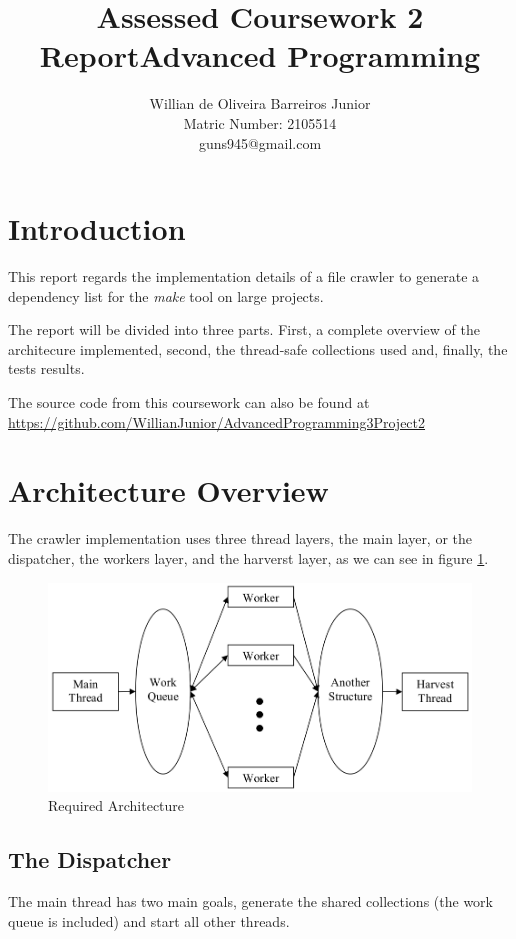 \documentclass[twocolumn,20pt]{article}
\title{Assessed Coursework 2 Report\linebreak Advanced Programming }
\author{Willian de Oliveira Barreiros Junior\\
Matric Number: 2105514\\
 guns945@gmail.com\\}
\begin{document}
\maketitle

\section{Introduction}
This report regards the implementation details of a file crawler to generate a dependency list for the \textit{make} tool on large projects.

The report will be divided into three parts. First, a complete overview of the architecure implemented, second, the thread-safe collections used and, finally, the tests results.

The source code from this coursework can also be found at
\url{https://github.com/WillianJunior/AdvancedProgramming3Project2}

\section{Architecture Overview}
The crawler implementation uses three thread layers, the main layer, or the dispatcher, the workers layer, and the harverst layer, as we can see in figure \ref{fig:arch}.

\begin{figure}[h]
\centering
\includegraphics[scale=0.20]{arch.png}
\caption{Required Architecture}
\label{fig:arch}
\end{figure}

\subsection{The Dispatcher}
The main thread has two main goals, generate the shared collections (the work queue is included) and start all other threads. 
\end{document}

